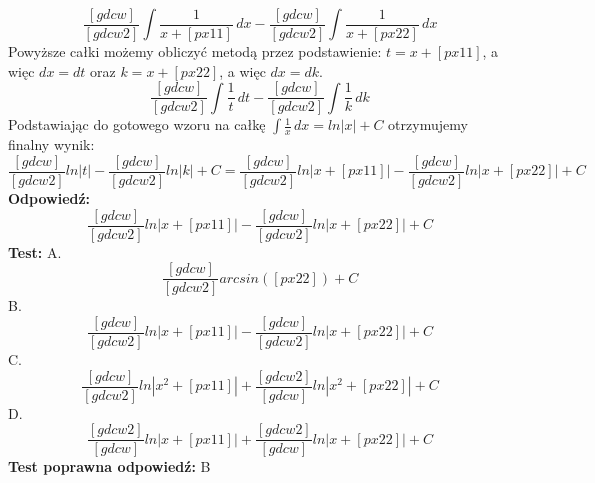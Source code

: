 \documentclass[12pt, a4paper]{article}
\theoremstyle{definition} %
\newcommand{\rozwStop}{\newline}                                            %
\newcommand{\odpStart}{\noindent \textbf{Odpowiedź:}\newline}    %
\newcommand{\odpStop}{\newline}                                             %
\newcommand{\testStart}{\noindent \textbf{Test:}\newline} %
\newcommand{\testStop}{\newline} %
\newcommand{\kluczStart}{\noindent \textbf{Test poprawna odpowiedź:}\newline} %
\newcommand{\kluczStop}{\newline} %
\begin{document}
$$\frac{[gdcw]}{[gdcw2]}\int \frac{1}{x+[px11]} \,dx-\frac{[gdcw]}{[gdcw2]}\int \frac{1}{x+[px22]} \,dx$$
Powyższe całki możemy obliczyć metodą przez podstawienie: $t=x+[px11]$, a więc $dx=dt$ oraz $k=x+[px22]$, a więc $dx=dk$.
$$\frac{[gdcw]}{[gdcw2]}\int \frac{1}{t} \,dt-\frac{[gdcw]}{[gdcw2]}\int \frac{1}{k} \,dk$$
Podstawiając do gotowego wzoru na całkę $\int \frac{1}{x} \,dx=ln|x|+C$ otrzymujemy finalny wynik:
$$\frac{[gdcw]}{[gdcw2]}ln|t|-\frac{[gdcw]}{[gdcw2]}ln|k|+C=\frac{[gdcw]}{[gdcw2]}ln|x+[px11]|-\frac{[gdcw]}{[gdcw2]}ln|x+[px22]|+C$$
\rozwStop
\odpStart
$$\frac{[gdcw]}{[gdcw2]}ln|x+[px11]|-\frac{[gdcw]}{[gdcw2]}ln|x+[px22]|+C$$
\odpStop
\testStart
A.$$\frac{[gdcw]}{[gdcw2]}arcsin([px22])+C$$
B.$$\frac{[gdcw]}{[gdcw2]}ln|x+[px11]|-\frac{[gdcw]}{[gdcw2]}ln|x+[px22]|+C$$
C.$$\frac{[gdcw]}{[gdcw2]}ln|x^2+[px11]|+\frac{[gdcw2]}{[gdcw]}ln|x^2+[px22]|+C$$
D.$$\frac{[gdcw2]}{[gdcw]}ln|x+[px11]|+\frac{[gdcw2]}{[gdcw]}ln|x+[px22]|+C$$
\testStop
\kluczStart
B
\kluczStop
\end{document}
